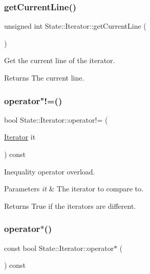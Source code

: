 \subsubsection{\texorpdfstring{get\+Current\+Line()}{getCurrentLine()}}
{\footnotesize\ttfamily unsigned int State\+::\+Iterator\+::get\+Current\+Line (\begin{DoxyParamCaption}{ }\end{DoxyParamCaption})\hspace{0.3cm}{\ttfamily [inline]}}

Get the current line of the iterator.

\begin{DoxyReturn}{Returns}
The current line. 
\end{DoxyReturn}
\mbox{\label{class_state_1_1_iterator_a31bf32bb11ba3294a3bc79ff27788998}} 
\subsubsection{\texorpdfstring{operator"!=()}{operator!=()}}
{\footnotesize\ttfamily bool State\+::\+Iterator\+::operator!= (\begin{DoxyParamCaption}\item[{\mbox{\hyperlink{class_state_1_1_iterator}{Iterator}}}]{it }\end{DoxyParamCaption}) const\hspace{0.3cm}{\ttfamily [inline]}}

Inequality operator overload.


\begin{DoxyParams}{Parameters}
{\em it} & The iterator to compare to. \\
\hline
\end{DoxyParams}
\begin{DoxyReturn}{Returns}
True if the iterators are different. 
\end{DoxyReturn}
\mbox{\label{class_state_1_1_iterator_ac3ce2db518495ab2cb563bfba62a79c1}} 
\subsubsection{\texorpdfstring{operator$\ast$()}{operator*()}}
{\footnotesize\ttfamily const bool State\+::\+Iterator\+::operator$\ast$ (\begin{DoxyParamCaption}{ }\end{DoxyParamCaption}) const\hspace{0.3cm}{\ttfamily [inline]}}

